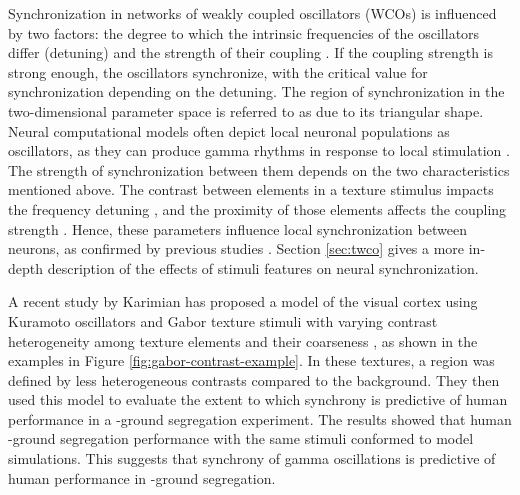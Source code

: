 Synchronization in networks of weakly coupled oscillators (WCOs) is influenced by two factors: the degree to which the intrinsic frequencies of the oscillators differ (detuning) and the strength of their coupling \cite{Pikovsky2002, Tiesinga2010, Lowet2015}. If the coupling strength is strong enough, the oscillators synchronize, with the critical value for synchronization depending on the detuning. The region of synchronization in the two-dimensional parameter space is referred to as  due to its triangular shape.
Neural computational models often depict local neuronal populations as oscillators, as they can produce gamma rhythms in response to local stimulation \cite{IzhikevichBook2004:9}. The strength of synchronization between them depends on the two characteristics mentioned above. The contrast between elements in a texture stimulus impacts the frequency detuning \cite{Lowet2017, Ray2010}, and the proximity of those elements affects the coupling strength \cite{Gilbert1983, Tso1986a, Lowet2015, Lowet2017, Stettler2002, MaryamPLACEHOLDER}. Hence, these parameters influence local synchronization between neurons, as confirmed by previous studies \cite{Lowet2017, MaryamPLACEHOLDER}. Section \ref{sec:twco} gives a more in-depth description of the effects of stimuli features on neural synchronization.

A recent study by Karimian has proposed a model of the visual cortex using Kuramoto oscillators and Gabor texture stimuli with varying contrast heterogeneity among texture elements and their coarseness \cite{MaryamPLACEHOLDER}, as shown in the examples in Figure \ref{fig:gabor-contrast-example}. In these textures, a \stimfig{} region was defined by less heterogeneous contrasts compared to the background.
They then used this model to evaluate the extent to which synchrony is predictive of human performance in a \stimfig-ground segregation experiment. The results showed that human \stimfig-ground segregation performance with the same stimuli conformed to model simulations. This suggests that synchrony of gamma oscillations is predictive of human performance in \stimfig-ground segregation. 

